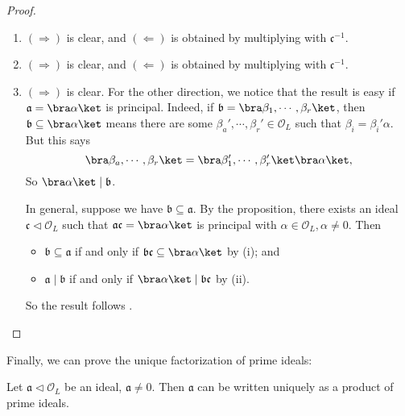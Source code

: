 \documentclass[a4paper]{article}
\begin{document}
\begin{proof}\leavevmode
  \begin{enumerate}
    \item $(\Rightarrow)$ is clear, and $(\Leftarrow)$ is obtained by multiplying with $\mathfrak{c}^{-1}$.
    \item $(\Rightarrow)$ is clear, and $(\Leftarrow)$ is obtained by multiplying with $\mathfrak{c}^{-1}$.
    \item $(\Rightarrow)$ is clear. For the other direction, we notice that the result is easy if $\mathfrak{a} = \bra \alpha\ket$ is principal. Indeed, if $\mathfrak{b} = \bra \beta_1, \cdots, \beta_r\ket$, then $\mathfrak{b} \subseteq \bra \alpha\ket$ means there are some $\beta_a', \cdots, \beta_r' \in \mathcal{O}_L$ such that $\beta_i = \beta_i' \alpha$. But this says
      \[
        \bra \beta_a, \cdots, \beta_r\ket = \bra \beta_1', \cdots, \beta_r' \ket \bra \alpha\ket,
      \]
      So $\bra \alpha\ket \mid \mathfrak{b}$.

      In general, suppose we have $\mathfrak{b} \subseteq \mathfrak{a}$. By the proposition, there exists an ideal $\mathfrak{c} \lhd \mathcal{O}_L$ such that $\mathfrak{a}\mathfrak{c} = \bra \alpha\ket$ is principal with $\alpha \in \mathcal{O}_L, \alpha \not= 0$. Then
      \begin{itemize}
        \item $\mathfrak{b}\subseteq \mathfrak{a}$ if and only if $\mathfrak{b}\mathfrak{c} \subseteq \bra \alpha\ket$ by (i); and
        \item $\mathfrak{a} \mid \mathfrak{b}$ if and only if $\bra \alpha\ket \mid \mathfrak{b}\mathfrak{c}$ by (ii).
      \end{itemize}
      So the result follows .
  \end{enumerate}
\end{proof}

Finally, we can prove the unique factorization of prime ideals:
\begin{thm}
  Let $\mathfrak{a} \lhd \mathcal{O}_L$ be an ideal, $\mathfrak{a} \not= 0$. Then $\mathfrak{a}$ can be written uniquely as a product of prime ideals.
\end{thm}
\end{document}

